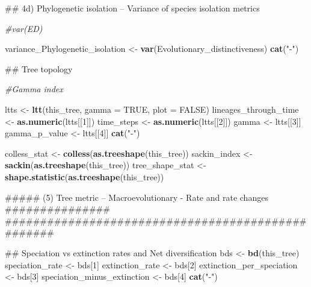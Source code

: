 \documentclass[]{book}
\newenvironment{Shaded}{\begin{snugshade}}{\end{snugshade}}
\newcommand{\KeywordTok}[1]{\textcolor[rgb]{0.13,0.29,0.53}{\textbf{{#1}}}}
\newcommand{\DataTypeTok}[1]{\textcolor[rgb]{0.13,0.29,0.53}{{#1}}}
\newcommand{\DecValTok}[1]{\textcolor[rgb]{0.00,0.00,0.81}{{#1}}}
\newcommand{\StringTok}[1]{\textcolor[rgb]{0.31,0.60,0.02}{{#1}}}
\newcommand{\CommentTok}[1]{\textcolor[rgb]{0.56,0.35,0.01}{\textit{{#1}}}}
\newcommand{\OtherTok}[1]{\textcolor[rgb]{0.56,0.35,0.01}{{#1}}}
\newcommand{\NormalTok}[1]{{#1}}
\theoremstyle{definition}
\theoremstyle{definition}
\theoremstyle{remark}
\begin{document}
\begin{Shaded}
\begin{Highlighting}[]
{\NormalTok{    ## 4d) Phylogenetic isolation -- Variance of species isolation metrics}

    \CommentTok{#var(ED)}

\NormalTok{    variance_Phylogenetic_isolation <-}\StringTok{ }\KeywordTok{var}\NormalTok{(Evolutionary_distinctiveness)}
    \KeywordTok{cat}\NormalTok{(}\StringTok{"-"}\NormalTok{)}

\NormalTok{    ## Tree topology}

    \CommentTok{#Gamma index}

\NormalTok{    ltts <-}\StringTok{ }\KeywordTok{ltt}\NormalTok{(this_tree, }\DataTypeTok{gamma =} \OtherTok{TRUE}\NormalTok{, }\DataTypeTok{plot =} \OtherTok{FALSE}\NormalTok{)}
\NormalTok{    lineages_through_time <-}\StringTok{ }\KeywordTok{as.numeric}\NormalTok{(ltts[[}\DecValTok{1}\NormalTok{]])}
\NormalTok{    time_steps <-}\StringTok{ }\KeywordTok{as.numeric}\NormalTok{(ltts[[}\DecValTok{2}\NormalTok{]])}
\NormalTok{    gamma <-}\StringTok{ }\NormalTok{ltts[[}\DecValTok{3}\NormalTok{]]}
\NormalTok{    gamma_p_value <-}\StringTok{ }\NormalTok{ltts[[}\DecValTok{4}\NormalTok{]]}
    \KeywordTok{cat}\NormalTok{(}\StringTok{"-"}\NormalTok{)}

\NormalTok{    colless_stat <-}\StringTok{ }\KeywordTok{colless}\NormalTok{(}\KeywordTok{as.treeshape}\NormalTok{(this_tree))}
\NormalTok{    sackin_index <-}\StringTok{ }\KeywordTok{sackin}\NormalTok{(}\KeywordTok{as.treeshape}\NormalTok{(this_tree))}
\NormalTok{    tree_shape_stat <-}\StringTok{ }\KeywordTok{shape.statistic}\NormalTok{(}\KeywordTok{as.treeshape}\NormalTok{(this_tree))}

\NormalTok{    ##### (5) Tree metric -- Macroevolutionary - Rate and rate changes ###############}
\NormalTok{    ##################################################}

\NormalTok{    ## Speciation vs extinction rates and Net diversification}
\NormalTok{    bds <-}\StringTok{ }\KeywordTok{bd}\NormalTok{(this_tree)}
\NormalTok{    speciation_rate <-}\StringTok{ }\NormalTok{bds[}\DecValTok{1}\NormalTok{]}
\NormalTok{    extinction_rate <-}\StringTok{ }\NormalTok{bds[}\DecValTok{2}\NormalTok{]}
\NormalTok{    extinction_per_speciation <-}\StringTok{ }\NormalTok{bds[}\DecValTok{3}\NormalTok{]}
\NormalTok{    speciation_minus_extinction <-}\StringTok{ }\NormalTok{bds[}\DecValTok{4}\NormalTok{]}
    \KeywordTok{cat}\NormalTok{(}\StringTok{"-"}\NormalTok{)}

}
\end{Highlighting}
\end{Shaded}
\end{document}
